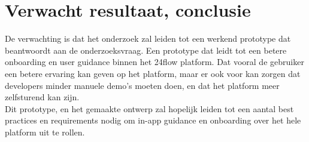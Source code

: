 \section{Verwacht resultaat, conclusie}%
\label{sec:verwachte_resultaten}
De verwachting is dat het onderzoek zal leiden tot een werkend prototype dat beantwoordt aan de onderzoeksvraag. Een prototype dat leidt tot een betere onboarding en user guidance binnen het 24flow platform. Dat vooral de gebruiker een betere ervaring kan geven op het platform, maar er ook voor kan zorgen dat developers minder manuele demo's moeten doen, en dat het platform meer zelfsturend kan zijn.
\\

Dit prototype, en het gemaakte ontwerp zal hopelijk leiden tot een aantal best practices en requirements nodig om in-app guidance en onboarding over het hele platform uit te rollen.


